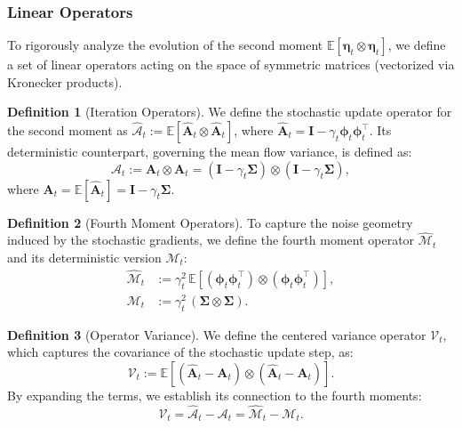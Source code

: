 \documentclass{article}
\theoremstyle{definition}
\newtheorem{definition}{Definition}
\theoremstyle{definition}
\theoremstyle{plain}
\theoremstyle{plain}
\theoremstyle{plain}
\theoremstyle{plain}
\theoremstyle{plain}
\newcommand{\bs}[1]{\boldsymbol{\mathbf{#1}}}
\begin{document}
\subsubsection{Linear Operators}
\label{app:linear_operators}

To rigorously analyze the evolution of the second moment $\mathbb{E}[\bs \eta_t \otimes \bs \eta_t]$, we define a set of linear operators acting on the space of symmetric matrices (vectorized via Kronecker products).

\begin{definition}[Iteration Operators]
    We define the stochastic update operator for the second moment as $\widehat{\mathcal{A}}_t := \mathbb{E}[\bs{\widehat A}_t \otimes \bs{\widehat A}_t]$, where $\bs{\widehat A}_t = \mathbf{I} - \gamma_t \bs \phi_t \bs \phi_t^\top$. Its deterministic counterpart, governing the mean flow variance, is defined as:
    \begin{equation}
        \mathcal{A}_t := \bs A_t \otimes \bs A_t = (\mathbf{I} - \gamma_t \bs \Sigma) \otimes (\mathbf{I} - \gamma_t \bs \Sigma),
    \end{equation}
    where $\bs A_t = \mathbb{E}[\bs{\widehat A}_t] = \mathbf{I} - \gamma_t \bs \Sigma$.
\end{definition}

\begin{definition}[Fourth Moment Operators]
    To capture the noise geometry induced by the stochastic gradients, we define the fourth moment operator $\widehat{\mathcal{M}}_t$ and its deterministic version $\mathcal{M}_t$:
    \begin{align}
        \widehat{\mathcal{M}}_t &:= \gamma_t^2 \, \mathbb{E}[(\bs \phi_t \bs \phi_t^\top) \otimes (\bs \phi_t \bs \phi_t^\top)], \\
        \mathcal{M}_t &:= \gamma_t^2 \, (\bs \Sigma \otimes \bs \Sigma).
    \end{align}
\end{definition}


\begin{definition}[Operator Variance]
    We define the centered variance operator $\mathcal{V}_t$, which captures the covariance of the stochastic update step, as:
    \begin{equation}
        \mathcal{V}_t := \mathbb{E}[(\bs{\widehat A}_t - \bs A_t) \otimes (\bs{\widehat A}_t - \bs A_t)].
    \end{equation}
    By expanding the terms, we establish its connection to the fourth moments:
    \begin{equation}
    \label{eq:varianceoperatorexpansion}
        \mathcal{V}_t = \widehat{\mathcal{A}}_t - \mathcal{A}_t = \widehat{\mathcal{M}}_t - \mathcal{M}_t.
    \end{equation}
\end{definition}
\end{document}

